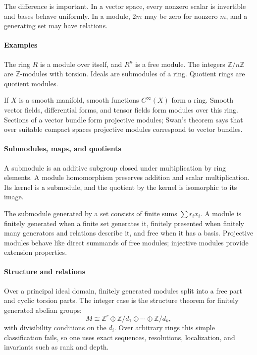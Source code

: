 The difference is important. In a vector space, every nonzero scalar is invertible and bases behave uniformly. In a module, $2m$ may be zero for nonzero $m$, and a generating set may have relations.

\paragraph{Examples}
The ring $R$ is a module over itself, and $R^n$ is a free module. The integers $\mathbb Z/n\mathbb Z$ are $\mathbb Z$-modules with torsion. Ideals are submodules of a ring. Quotient rings are quotient modules.

If $X$ is a smooth manifold, smooth functions $C^\infty(X)$ form a ring. Smooth vector fields, differential forms, and tensor fields form modules over this ring. Sections of a vector bundle form projective modules; Swan's theorem says that over suitable compact spaces projective modules correspond to vector bundles.

\paragraph{Submodules, maps, and quotients}
A submodule is an additive subgroup closed under multiplication by ring elements. A module homomorphism preserves addition and scalar multiplication. Its kernel is a submodule, and the quotient by the kernel is isomorphic to its image.

The submodule generated by a set consists of finite sums $\sum r_i x_i$. A module is finitely generated when a finite set generates it, finitely presented when finitely many generators and relations describe it, and free when it has a basis. Projective modules behave like direct summands of free modules; injective modules provide extension properties.

\paragraph{Structure and relations}
Over a principal ideal domain, finitely generated modules split into a free part and cyclic torsion parts. The integer case is the structure theorem for finitely generated abelian groups:
\[
M\cong\mathbb Z^r\oplus\mathbb Z/d_1\oplus\cdots\oplus\mathbb Z/d_k,
\]
with divisibility conditions on the $d_i$. Over arbitrary rings this simple classification fails, so one uses exact sequences, resolutions, localization, and invariants such as rank and depth.

